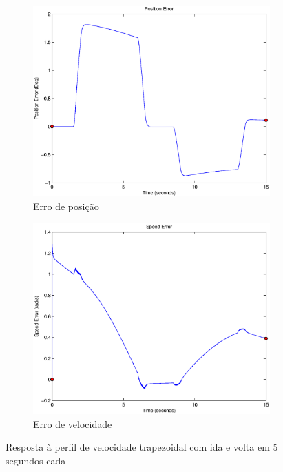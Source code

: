 \documentclass{article}
\begin{document}
\begin{figure}[H]
\begin{subfigure}{0.32\textwidth}
		\includegraphics[width=\linewidth]{matlab/ep5}
		\caption{Erro de posição}
	\end{subfigure}
	\begin{subfigure}{0.32\textwidth}
		\includegraphics[width=\linewidth]{matlab/ew5}
		\caption{Erro de velocidade}
	\end{subfigure}
	\caption{Resposta à perfil de velocidade trapezoidal com ida e volta em 5 segundos cada}	
	\label{fig:sim5res}
\end{figure}
\end{document}
